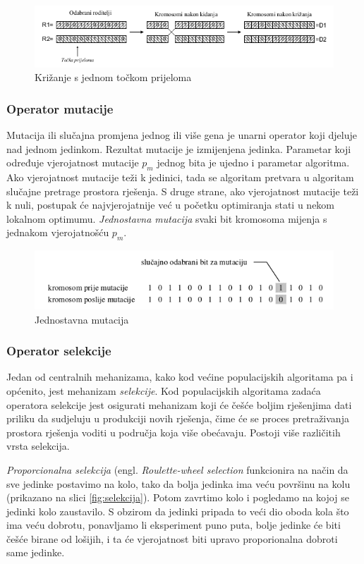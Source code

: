 \documentclass[times, utf8, zavrsni]{fer}
\begin{document}
\begin{figure}[htb]
\centering
\includegraphics[width=12cm]{img/krizanje.png}
\caption{Križanje s jednom točkom prijeloma}
\label{fig:krizanje}
\end{figure}

\subsubsection{Operator mutacije}
Mutacija ili slučajna promjena jednog ili više gena je unarni operator koji djeluje nad jednom jedinkom. Rezultat mutacije je izmijenjena jedinka. Parametar koji određuje vjerojatnost mutacije $p_m$ jednog bita je ujedno i parametar algoritma. Ako vjerojatnost mutacije teži k jedinici, tada se algoritam pretvara u algoritam slučajne pretrage prostora rješenja. S druge strane, ako vjerojatnost mutacije teži k nuli, postupak će najvjerojatnije već u početku optimiranja stati u nekom lokalnom optimumu. \emph{Jednostavna mutacija} svaki bit kromosoma mijenja s jednakom vjerojatnošću $p_m$.

\begin{figure}[htb]
\centering
\includegraphics[width=12cm]{img/mutacija.png}
\caption{Jednostavna mutacija}
\label{fig:mutacija}
\end{figure}

\subsubsection{Operator selekcije}
Jedan od centralnih mehanizama, kako kod većine populacijskih algoritama pa i općenito, jest mehanizam \emph{selekcije}. Kod populacijskih algoritama zadaća operatora selekcije jest osigurati mehanizam koji će češće boljim rješenjima dati priliku da sudjeluju u produkciji novih rješenja, čime će se proces pretraživanja prostora rješenja voditi u područja koja više obećavaju. Postoji više različitih vrsta selekcija.

\emph{Proporcionalna selekcija} (engl. \emph{Roulette-wheel selection} funkcionira na način da sve jedinke postavimo na kolo, tako da bolja jedinka ima veću površinu na kolu (prikazano na slici \ref{fig:selekcija}). Potom zavrtimo kolo i pogledamo na kojoj se jedinki kolo zaustavilo. S obzirom da jedinki pripada to veći dio oboda kola što ima veću dobrotu, ponavljamo li eksperiment puno puta, bolje jedinke će biti češće birane od lošijih, i ta će vjerojatnost biti upravo proporionalna dobroti same jedinke.
\end{document}
